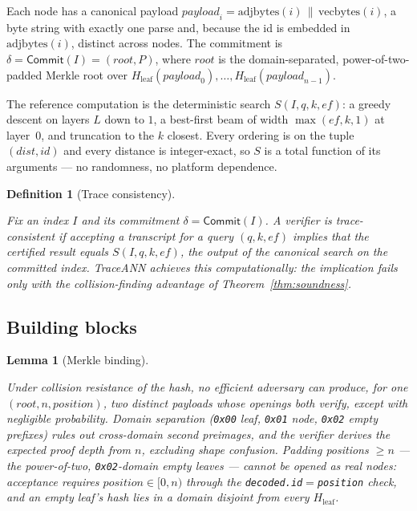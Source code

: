 \documentclass[11pt]{article}
\newtheorem{lemma}{Lemma}
\newtheorem{definition}{Definition}
\newcommand{\sys}{TraceANN}
\begin{document}
Each node has a canonical payload
$\mathit{payload}_i=\mathrm{adjbytes}(i)\,\|\,\mathrm{vecbytes}(i)$, a
byte string with exactly one parse and, because the id is embedded in
$\mathrm{adjbytes}(i)$, distinct across nodes. The commitment is
$\delta=\mathsf{Commit}(I)=(\mathit{root},P)$, where $\mathit{root}$ is
the domain-separated, power-of-two-padded Merkle root over
$H_{\mathrm{leaf}}(\mathit{payload}_0),\dots,H_{\mathrm{leaf}}(\mathit{payload}_{n-1})$.

The reference computation is the deterministic search
$S(I,q,k,\mathit{ef})$: a greedy descent on layers $L$ down to $1$, a
best-first beam of width $\max(\mathit{ef},k,1)$ at layer~$0$, and
truncation to the $k$ closest. Every ordering is on the tuple
$(\mathit{dist},\mathit{id})$ and every distance is integer-exact, so
$S$ is a total function of its arguments --- no randomness, no platform
dependence.

\begin{definition}[Trace consistency]\label{def:tc}

Fix an index $I$ and its commitment $\delta=\mathsf{Commit}(I)$. A
verifier is \emph{trace-consistent} if accepting a transcript for a
query $(q,k,\mathit{ef})$ implies that the certified result equals
$S(I,q,k,\mathit{ef})$, the output of the canonical search on the
committed index. \sys{} achieves this computationally: the implication
fails only with the collision-finding advantage of
Theorem~\ref{thm:soundness}.

\end{definition}

\subsection{Building blocks}

\begin{lemma}[Merkle binding]\label{lem:binding}

Under collision resistance of the hash, no efficient adversary can
produce, for one $(\mathit{root},n,\mathit{position})$, two distinct
payloads whose openings both verify, except with negligible probability.
Domain separation (\texttt{0x00} leaf, \texttt{0x01} node, \texttt{0x02}
empty prefixes) rules out cross-domain second preimages, and the
verifier derives the expected proof depth from $n$, excluding shape
confusion. Padding positions $\ge n$ --- the power-of-two,
\texttt{0x02}-domain empty leaves --- cannot be opened as real nodes:
acceptance requires $\mathit{position}\in[0,n)$ through the
\texttt{decoded.id}${=}$\texttt{position} check, and an empty leaf's
hash lies in a domain disjoint from every $H_{\mathrm{leaf}}$.

\end{lemma}
\end{document}
